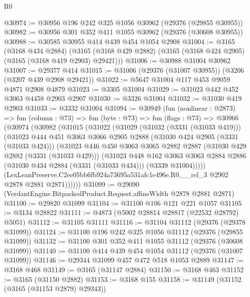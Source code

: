 \begin{lexlean}{R0}
\begin{coremodule}
@30974 := @30956 @196 @242 @325 @1056 @30962 (@29376 (@29855 @30955))
@30982 := @30956 @301 @352 @411 @1055 @30962 (@29376 (@30608 @30955))
@30988 := @30585 @30955 @414 @439 @454 @1054 @2908
@31004 := @3165
    (@3168 @434 @2884)
    (@3165 (@3168 @429 @2882) (@3165 (@3168 @424 @2905) (@3165 (@3168 @419 @2903) @29421)))
@31006 := @30988 @31004 @30962
@31007 := @29377 @414
@31015 := @31006 (@29376 (@31007 @30955)) (@3206 (@3207 @439 @2908 @29421))
@31022 := @5647 @31004 @117 @453 @9059 @4871 @2908 @4879
@31023 := @3305 @31004
@31029 := @31023 @442 @452 @3063 @4458 @2903 @2907
@31030 := @3326 @31004
@31032 := @31030 @419 @2903
@31033 := @3332 @31004
@31094 := @30949
    (fun (nonlinear : @2873) =>
    fun (column : @73) =>
    fun (byte : @73) =>
    fun (flags : @73) =>
    @30966
      (@30974
        (@30982
          (@31015
            (@31022
              (@31029
                (@31032 (@3331 (@31033 @419)))
                (@31023
                  @444
                  @451
                  @3063
                  @3066
                  @2905
                  @2888
                  (@31030 @424 @2905 (@3331 (@31033 @424)))
                  (@31023
                    @446
                    @450
                    @3063
                    @3065
                    @2882
                    @2887
                    (@31030 @429 @2882 (@3331 (@31033 @429)))
                    (@31023
                      @448
                      @162
                      @3063
                      @3063
                      @2884
                      @2886
                      (@31030 @434 @2884 (@3331 (@31033 @434)))
                      (@3339 @31004)))))
              (LexLeanPreserve.C2ee05bb6fb924a73695a531afc1e496e.R0.__rel_3
                @2902
                @2878
                @2881
                @2871))))))
@31099 := @29090 (VerdantEngine.BitpackedProduct.Request.affineWidth @2878 @2881 @2871)
@31100 := @29820 @31099
@31104 := @31100 @106 @121 @221 @1057
@31105 := @3134 @28822
@31111 := @4873 (@5002 @28814 @28817 (@22532 @28792) @5051)
@31112 := @31105 @31111
@31116 := @31104 @31112 (@29376 (@29378 @31099))
@31124 := @31100 @196 @242 @325 @1056 @31112 (@29376 (@29855 @31099))
@31132 := @31100 @301 @352 @411 @1055 @31112 (@29376 (@30608 @31099))
@31140 := @31100 @414 @439 @454 @1054 @31112 (@29376 (@31007 @31099))
@31146 := @29344 @31099 @457 @472 @518 @1053 @2889
@31147 := @3168 @468
@31149 := @3165 (@31147 @2884)
@31150 := @3168 @463
@31152 := @3165 (@31150 @2882)
@31153 := @3168 @155
@31158 := @31149 (@31152 (@3165 (@31153 @2879) @29343))

\end{coremodule}
\end{lexlean}
